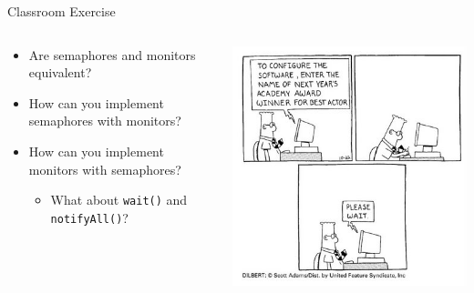 \begin{frame}{Classroom Exercise}
  \begin{columns}[c]
    \begin{column}{0.45\textwidth}
      \begin{itemize}
      \item Are semaphores and monitors equivalent?
      \item How can you implement semaphores with monitors?
      \item How can you implement monitors with semaphores?
        \begin{itemize}
        \item What about \lstinline!wait()! and \lstinline!notifyAll()!?
        \end{itemize}
      \end{itemize}
    \end{column}
    \begin{column}{0.55\textwidth}
      \begin{center}
        \includegraphics[width=\textwidth]{figures/dilbert-wait}
      \end{center}
    \end{column}
  \end{columns}
\end{frame}

